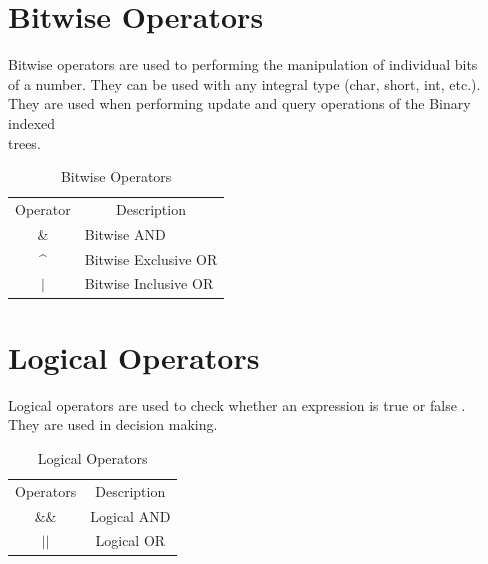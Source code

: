 \documentclass[openany]{book}  %
\begin{document}
\section{Bitwise Operators}
Bitwise operators\cite{Ref8} are used to performing the manipulation of individual bits \\
of a number. They can be used with any integral type (char, short, int, etc.). \\
They are used when performing update and query operations of the Binary indexed \\
trees.
% 
%
\begin{table}[htbp]
    \begin{tabular}{cl}
        Operator           & \multicolumn{1}{c}{Description} \\
        \&                 & Bitwise AND                     \\
        \textasciicircum{} & Bitwise Exclusive OR            \\
        $\vert$            & Bitwise Inclusive OR
    \end{tabular}
    \centering
    \caption{Bitwise Operators}
\end{table}
% 
% 
\section{Logical Operators}
Logical operators\cite{Ref8} are used to check whether an expression is true or false . \\
They are used in decision making.
% 
%
\begin{table}[htbp]
    \begin{tabular}{cc}
        Operators      & Description \\
        \&\&           & Logical AND \\
        $\vert$$\vert$ & Logical OR
    \end{tabular}
    \centering
    \caption{Logical Operators}
\end{table}
% 
% 
\end{document}
